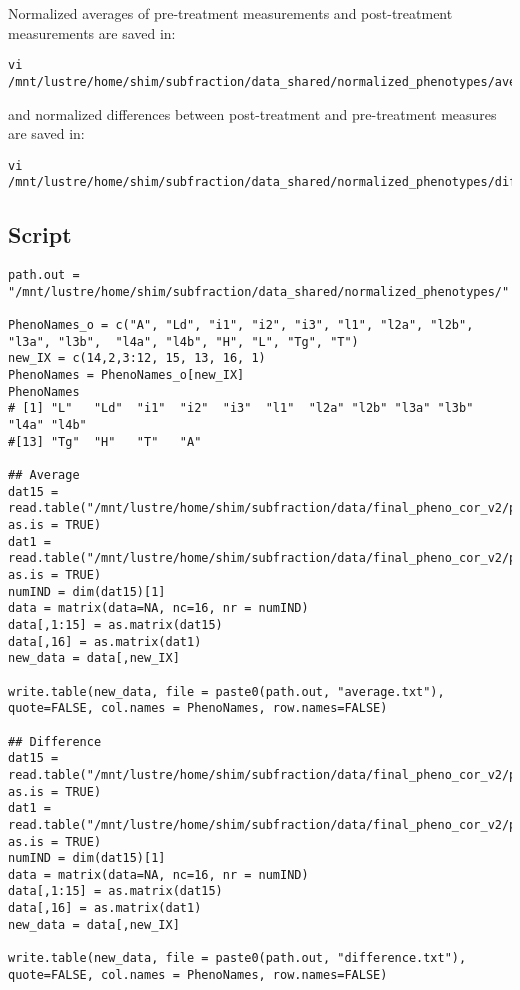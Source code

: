 \documentclass[11pt]{article}
\begin{document}
Normalized averages of pre-treatment measurements and post-treatment measurements are saved in:
\begin{lstlisting}
vi /mnt/lustre/home/shim/subfraction/data_shared/normalized_phenotypes/average.txt
\end{lstlisting}
and normalized differences between post-treatment and pre-treatment measures are saved in:
\begin{lstlisting}
vi /mnt/lustre/home/shim/subfraction/data_shared/normalized_phenotypes/difference.txt
\end{lstlisting}

\subsection{Script}
\label{sec-3-1}
\begin{lstlisting}
path.out = "/mnt/lustre/home/shim/subfraction/data_shared/normalized_phenotypes/"

PhenoNames_o = c("A", "Ld", "i1", "i2", "i3", "l1", "l2a", "l2b", "l3a", "l3b",  "l4a", "l4b", "H", "L", "Tg", "T")   
new_IX = c(14,2,3:12, 15, 13, 16, 1)
PhenoNames = PhenoNames_o[new_IX]
PhenoNames
# [1] "L"   "Ld"  "i1"  "i2"  "i3"  "l1"  "l2a" "l2b" "l3a" "l3b" "l4a" "l4b"
#[13] "Tg"  "H"   "T"   "A"  

## Average 
dat15 = read.table("/mnt/lustre/home/shim/subfraction/data/final_pheno_cor_v2/phenotype_ready/Sum_II_1_a", as.is = TRUE)
dat1 = read.table("/mnt/lustre/home/shim/subfraction/data/final_pheno_cor_v2/phenotype_ready/TC_sum", as.is = TRUE)
numIND = dim(dat15)[1]
data = matrix(data=NA, nc=16, nr = numIND)
data[,1:15] = as.matrix(dat15)
data[,16] = as.matrix(dat1)
new_data = data[,new_IX]

write.table(new_data, file = paste0(path.out, "average.txt"), quote=FALSE, col.names = PhenoNames, row.names=FALSE)

## Difference
dat15 = read.table("/mnt/lustre/home/shim/subfraction/data/final_pheno_cor_v2/phenotype_ready/Diff_II_1_a", as.is = TRUE)
dat1 = read.table("/mnt/lustre/home/shim/subfraction/data/final_pheno_cor_v2/phenotype_ready/TC_diff", as.is = TRUE)
numIND = dim(dat15)[1]
data = matrix(data=NA, nc=16, nr = numIND)
data[,1:15] = as.matrix(dat15)
data[,16] = as.matrix(dat1)
new_data = data[,new_IX]

write.table(new_data, file = paste0(path.out, "difference.txt"), quote=FALSE, col.names = PhenoNames, row.names=FALSE)
\end{lstlisting}
\end{document}
